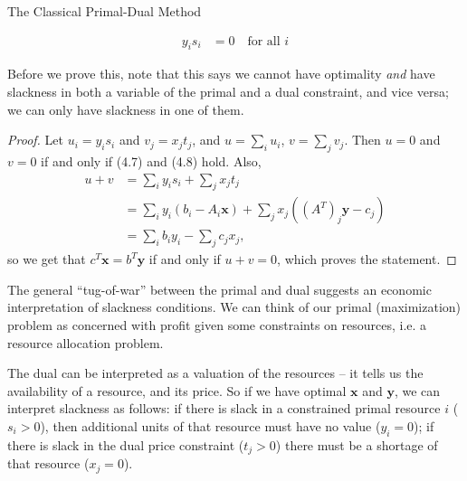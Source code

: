\begin{section}{The Classical Primal-Dual Method}
\begin{theorem}
\begin{align}
			y_is_i &= 0 \quad \text{for all } i
		\end{align}
	\end{theorem}
	Before we prove this, note that this says we cannot have optimality \emph{and} have slackness in 
	both a variable of the primal and a dual constraint, and vice versa; we can only have slackness 
	in one of them.
	\begin{proof}
		Let $u_i = y_is_i$ and $v_j = x_jt_j$, and $u = \sum_i u_i$, 
		$v = \sum_j v_j$. Then $u = 0$ and $v = 0$ if and only if 
		(4.7) and (4.8) hold. Also, 
		\begin{align*}
			u + v &= \sum_i y_is_i + \sum_j x_jt_j \\
			      &= \sum_i y_i(b_i - A_i\mathbf{x}) + \sum_j x_j ((A^{T})_j\mathbf{y}-c_j)\\
			      &= \sum_i b_iy_i - \sum_j c_jx_j,
		\end{align*}
		so we get that $c^{T}\mathbf{x} = b^{T}\mathbf{y}$ if and only if $u + v = 0$, which 
		proves the statement.	
	\end{proof}
	The general ``tug-of-war'' between the primal and dual suggests an economic interpretation 
	of slackness conditions. We can think of our primal (maximization) problem as concerned with 
	profit given some constraints on resources, i.e. a resource allocation problem. 
	
	The dual can 
	be interpreted as a valuation of the resources -- it tells us the availability of a resource, 
	and its price. So if we have optimal $\mathbf{x}$ and $\mathbf{y}$, we can interpret 
	slackness as follows: if there is slack in a constrained primal resource $i$ ($s_i > 0$), 
	then additional units of that resource must have no value ($y_i = 0$); if there is slack 
	in the dual price constraint ($t_j > 0$) there must be a shortage of that resource ($x_j = 0$).


\end{section}
